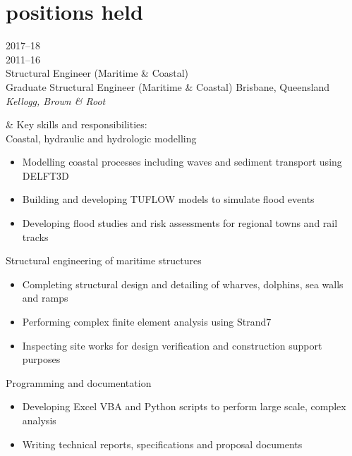 
\section{positions held}

\begin{entrylist}

\entry%
{2017--18\\
2011--16}
{\vspace*{-4.6ex}\\Structural Engineer (Maritime \& Coastal)\\
Graduate Structural Engineer (Maritime \& Coastal)}%
{Brisbane, Queensland}
{\emph{Kellogg, Brown \& Root}}

& Key skills and responsibilities:\\

\entrybulletsindented%
{}
{Coastal, hydraulic and hydrologic modelling}
{}
{\begin{itemize}
\item Modelling coastal processes including waves and sediment transport using DELFT3D
\item Building and developing TUFLOW models to simulate flood events
\item Developing flood studies and risk assessments for regional towns and rail tracks
\end{itemize}
}

\entrybulletsindented%
{}
{Structural engineering of maritime structures}
{}
{\begin{itemize}
  \item Completing structural design and detailing of wharves, dolphins, sea walls and ramps
  \item Performing complex finite element analysis using Strand7
  \item Inspecting site works for design verification and construction support purposes
\end{itemize}
}

\entrybulletsindented%
{}
{Programming and documentation}
{}
{\begin{itemize}
\item Developing Excel VBA and Python scripts to perform large scale, complex analysis
\item Writing technical reports, specifications and proposal documents

\end{itemize}}



\end{entrylist}